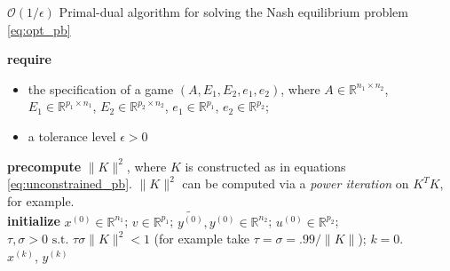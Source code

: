 \documentclass{article} %
\begin{document}
\begin{algorithm}[htb]
  \caption{$\mathcal{O}(1/\epsilon)$ Primal-dual algorithm for solving the Nash equilibrium problem \eqref{eq:opt_pb}}
  \textbf{require}
  \begin{itemize}
    \item the specification of a game $(A, E_1, E_2, e_1, e_2)$, where $A \in \mathbb{R}^{n_1 \times n_2}$,
  $E_1 \in \mathbb{R}^{p_1 \times n_1}$, $E_2 \in \mathbb{R}^{p_2 \times n_2}$, $e_1 \in \mathbb{R}^{p_1}$, $e_2 \in \mathbb{R}^{p_2}$;
      \item a tolerance level $\epsilon > 0$
  \end{itemize}
  \textbf{precompute} $\|K\|^2$, where $K$ is constructed as in equations \eqref{eq:unconstrained_pb}. $\|K\|^2$ can be computed via a \textit{power iteration} on $K^TK$, for example.\\
  \textbf{initialize}
  $x^{(0)} \in \mathbb{R}^{n_1}$; $v \in \mathbb{R}^{p_1}$; $\tilde{y^{(0)}}, y^{(0)} \in \mathbb{R}^{n_2}$; $u^{(0)} \in \mathbb{R}^{p_2}$; 
  $\tau, \sigma > 0 \text{ s.t. }\tau\sigma \|K\|^2 < 1$ (for example take $\tau = \sigma = .99/\|K\|$); $k = 0$.\\
   \Return $x^{(k)}$, $y^{(k)}$
  \label{Tab:algo_simplified}
\end{algorithm}
\end{document}
